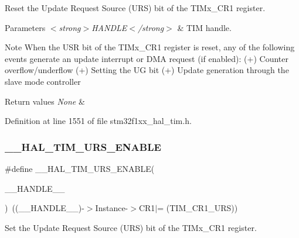 Reset the Update Request Source (U\+RS) bit of the T\+I\+Mx\+\_\+\+C\+R1 register. 


\begin{DoxyParams}{Parameters}
{\em $<$strong$>$\+H\+A\+N\+D\+L\+E$<$/strong$>$} & T\+IM handle. \\
\hline
\end{DoxyParams}
\begin{DoxyNote}{Note}
When the U\+SR bit of the T\+I\+Mx\+\_\+\+C\+R1 register is reset, any of the following events generate an update interrupt or D\+MA request (if enabled)\+: (+) Counter overflow/underflow (+) Setting the UG bit (+) Update generation through the slave mode controller 
\end{DoxyNote}

\begin{DoxyRetVals}{Return values}
{\em None} & \\
\hline
\end{DoxyRetVals}


Definition at line 1551 of file stm32f1xx\+\_\+hal\+\_\+tim.\+h.

\mbox{\label{group___t_i_m___exported___macros_ga3b06856bd6d7e10cfff342b1726db51d}} 
\subsubsection{\texorpdfstring{\+\_\+\+\_\+\+H\+A\+L\+\_\+\+T\+I\+M\+\_\+\+U\+R\+S\+\_\+\+E\+N\+A\+B\+LE}{\_\_HAL\_TIM\_URS\_ENABLE}}
{\footnotesize\ttfamily \#define \+\_\+\+\_\+\+H\+A\+L\+\_\+\+T\+I\+M\+\_\+\+U\+R\+S\+\_\+\+E\+N\+A\+B\+LE(\begin{DoxyParamCaption}\item[{}]{\+\_\+\+\_\+\+H\+A\+N\+D\+L\+E\+\_\+\+\_\+ }\end{DoxyParamCaption})~((\+\_\+\+\_\+\+H\+A\+N\+D\+L\+E\+\_\+\+\_\+)-\/$>$Instance-\/$>$C\+R1$\vert$= (T\+I\+M\+\_\+\+C\+R1\+\_\+\+U\+RS))}



Set the Update Request Source (U\+RS) bit of the T\+I\+Mx\+\_\+\+C\+R1 register. 


